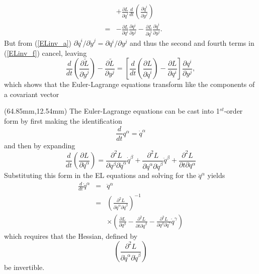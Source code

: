 \documentclass[10pt]{article}
\begin{document}
\begin{textblock*}{65mm}
\begin{eqnarray}
	&   & + \frac{\partial L}{\partial {\dot q}^i} \frac{d}{dt} \left( \frac{\partial {\dot q}^i}{\partial {\dot y}^j} \right) \\ \nonumber
    & = & - \frac{\partial L}{\partial q^i}        \frac{\partial q^i}{\partial y^j} 
	      - \frac{\partial L}{\partial {\dot q}^i} \frac{\partial {\dot q}^i}{\partial y^j} .\nonumber
\end{eqnarray}
But from (\ref{ELinv_a}) $ {\partial {\dot q}^i}/{\partial {\dot y}^j} = {\partial q^i}/{\partial y^j}$ and thus the second and
fourth terms in (\ref{ELinv_f}) cancel, leaving
\begin{equation}\label{ELinv_g}
  \frac{d}{dt} \left( \frac{\partial \tilde L}{\partial {\dot y}^j } \right) - \frac{\partial \tilde L}{\partial y^j} = 
  \left[ \frac{d}{d t} \left( \frac{\partial L}{\partial {\dot q}^i} \right) - \frac{\partial L}{\partial q^i} \right] 
  \frac{\partial q^i}{\partial y^j} ,
\end{equation}
which shows that the Euler-Lagrange equations transform like the components of a covariant vector
\end{textblock*}


\begin{textblock*}{65mm}(64.85mm,12.54mm)
The Euler-Lagrange equations can be cast into 1$^{st}$-order form by first making the identification
\[
  \frac{d}{d t} q^{\alpha} = {\dot q}^{\alpha}
\]
and then by expanding
\[
  \frac{d}{dt} \left( \frac{\partial L}{\partial {\dot q}^{\alpha}} \right) = 
    \frac{\partial^2 L}{\partial q^{\beta} \partial {\dot q}^{\alpha}} {\dot q}^{\beta} + 
	\frac{\partial^2 L}{\partial {\dot q}^{\alpha} \partial {\dot q}^{\beta}} {\ddot q^{\beta}}         +
	\frac{\partial^2 L}{\partial t \partial q^{\alpha}}                 
\]
Substituting this form in the EL equations and solving for the ${\ddot q}^{\alpha}$ yields
\begin{eqnarray*}
  \frac{d}{dt} {\dot q}^{\alpha} & = & {\ddot q}^{\alpha} \\ 
                                 & = & \left( \frac{\partial^2 L}{\partial {\dot q}^{\alpha} \partial {\dot q}^{\beta}} \right)^{-1} \\
								 &   & \times \left( \frac{\partial L}  {\partial q^{\beta}}                    -
							                         \frac{\partial^2 L}{\partial t \partial {\dot q}^{\beta}}  - 
									                 \frac{\partial^2 L}{\partial q^{\beta} \partial {\dot q}^{\gamma}} {\dot q}^{\gamma} 
									   \right)										  
\end{eqnarray*}
which requires that the Hessian, defined by
\[
  \left( \frac{\partial^2 L}{\partial {\dot q}^{\alpha} \partial {\dot q}^{\beta}} \right)
\]
be invertible.
\end{textblock*}
\end{document}
